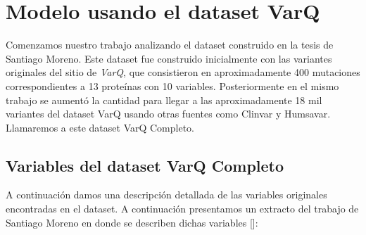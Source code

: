\section{Modelo usando el dataset VarQ}

Comenzamos nuestro trabajo analizando el dataset construido en la tesis de Santiago Moreno. Este dataset fue construido inicialmente con las variantes originales del sitio de \textit{VarQ}, que consistieron en aproximadamente 400 mutaciones correspondientes a 13 proteínas con 10 variables. Posteriormente en el mismo trabajo se aumentó la cantidad para llegar a las aproximadamente 18 mil variantes del dataset VarQ usando otras fuentes como Clinvar y Humsavar. Llamaremos a este dataset VarQ Completo. 

\subsection{Variables del dataset VarQ Completo}

A continuación damos una descripción detallada de las variables originales encontradas en el dataset. A continuación presentamos un extracto del trabajo de Santiago Moreno en donde se describen dichas variables []: 

